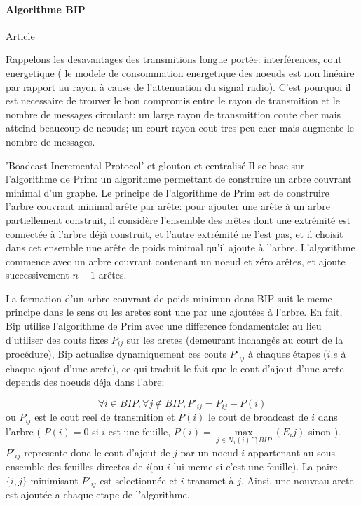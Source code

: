 \paragraph{Algorithme BIP}
Article \cite{Wieselthier2000}

  Rappelons les desavantages des transmitions longue portée: interférences, cout energetique ( le modele de consommation energetique des noeuds est non linéaire par rapport au rayon à cause de l'attenuation du signal radio).
C'est pourquoi il est necessaire de trouver le bon compromis entre le rayon de transmition et le nombre de messages circulant: un large rayon de transmittion coute cher mais atteind beaucoup de neouds; un court rayon cout tres peu cher mais 
augmente le nombre de messages. 

'Boadcast Incremental Protocol' et glouton et centralisé.Il se base sur l'algorithme de Prim: un algorithme permettant de construire un arbre couvrant minimal d'un graphe. Le principe de l'algorithme de Prim est de construire l'arbre couvrant minimal arête par arête: pour ajouter une 
arête à un arbre partiellement construit, il considère l'ensemble des arêtes dont une extrémité est
connectée à l'arbre déjà construit, et l'autre extrémité ne l'est pas, et
il choisit dans cet ensemble une arête de poids minimal qu'il ajoute à l'arbre. L'algorithme commence avec un arbre couvrant contenant un noeud et zéro arêtes, et ajoute successivement $n-1$ arêtes.

La formation d'un arbre couvrant de poids minimun dans BIP suit le meme principe dans le sens ou les aretes sont une par une ajoutées à l'arbre.
En fait, Bip utilise l'algorithme de Prim avec une difference fondamentale: au lieu d'utiliser des couts fixes $P_{ij}$ sur les aretes (demeurant inchangés au court de la procédure),
Bip actualise dynamiquement ces couts $P'_{ij}$ à chaques étapes ($i.e$ à chaque ajout d'une arete), ce qui traduit le fait que le cout d'ajout d'une arete depends des noeuds déja dans l'abre:

$$ \forall i \in BIP, \forall j \notin BIP, P'_{ij}=P_{ij}-P(i)$$
ou $P_{ij}$ est le cout reel de transmition et $P(i)$ le cout de broadcast de $i$ dans l'arbre ( $P(i)=0$ si $i$ est une feuille, $P(i)=\max\limits_{j\in N_1(i)\bigcap BIP}(E_ij)$ sinon ). $P'_{ij}$ represente donc le cout d'ajout de $j$ par un noeud $i$ appartenant au sous ensemble des feuilles
directes de $i$(ou $i$ lui meme si c'est une feuille). La paire $\{i,j\}$ minimisant $P'_{ij}$ est selectionnée et $i$ transmet à $j$. Ainsi, une nouveau arete est ajoutée a chaque etape de l'algorithme.\\



